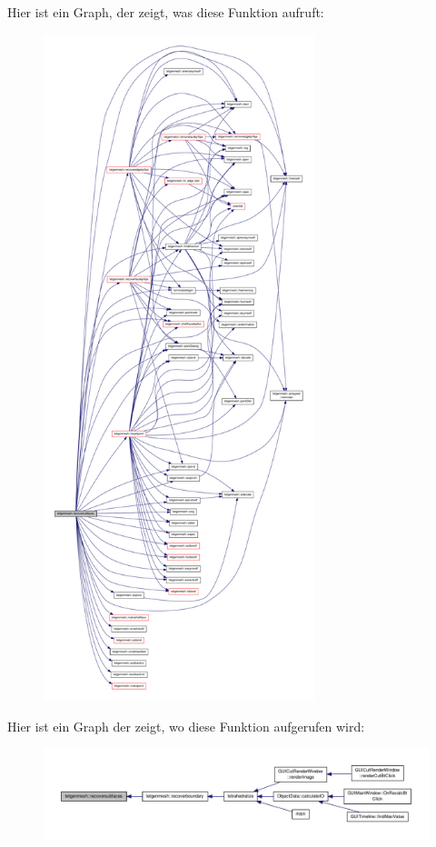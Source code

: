 Hier ist ein Graph, der zeigt, was diese Funktion aufruft\-:
\nopagebreak
\begin{figure}[H]
\begin{center}
\leavevmode
\includegraphics[height=550pt]{classtetgenmesh_ace09080e4f274e0a48cd1728475878c9_cgraph}
\end{center}
\end{figure}




Hier ist ein Graph der zeigt, wo diese Funktion aufgerufen wird\-:
\nopagebreak
\begin{figure}[H]
\begin{center}
\leavevmode
\includegraphics[width=350pt]{classtetgenmesh_ace09080e4f274e0a48cd1728475878c9_icgraph}
\end{center}
\end{figure}



